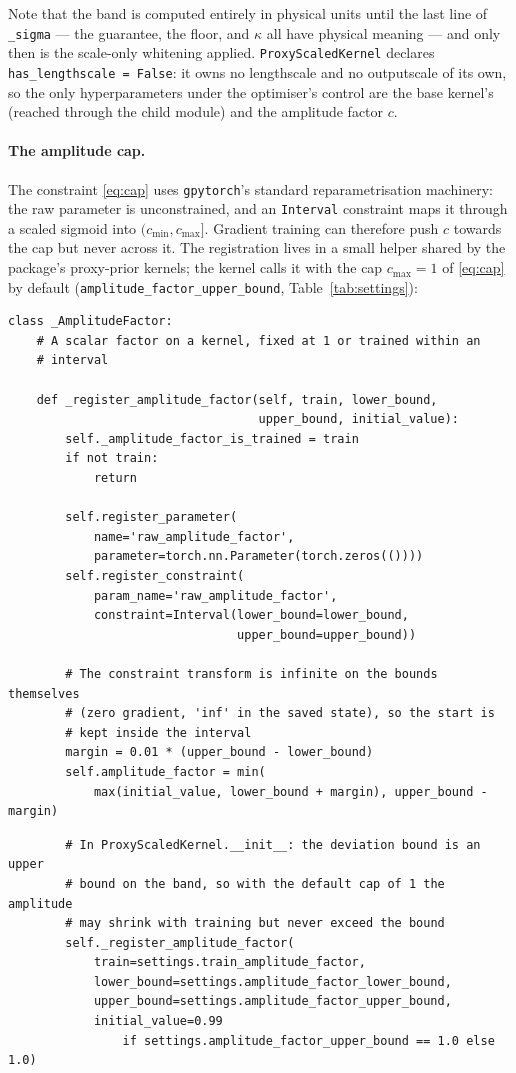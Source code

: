 \documentclass[11pt,a4paper]{article}
\newcommand{\code}[1]{\texttt{#1}}
\begin{document}
Note that the band is computed entirely in physical units until the last
line of \code{\_sigma} --- the guarantee, the floor, and $\kappa$ all have
physical meaning --- and only then is the scale-only whitening applied.
\code{ProxyScaledKernel}
declares \code{has\_lengthscale = False}: it owns no lengthscale and no
outputscale of its own, so the only hyperparameters under the optimiser's
control are the base kernel's (reached through the child module) and the
amplitude factor $c$.

\paragraph{The amplitude cap.} The constraint \eqref{eq:cap} uses
\code{gpytorch}'s standard reparametrisation machinery: the raw parameter is
unconstrained, and an \code{Interval} constraint maps it through a scaled
sigmoid into $(c_{\min}, c_{\max}]$. Gradient training can therefore push $c$
towards the cap but never across it. The registration lives in a small
helper shared by the package's proxy-prior kernels; the kernel calls it with
the cap $c_{\max} = 1$ of \eqref{eq:cap} by default
(\code{amplitude\_factor\_upper\_bound}, Table~\ref{tab:settings}):

\begin{lstlisting}
class _AmplitudeFactor:
    # A scalar factor on a kernel, fixed at 1 or trained within an
    # interval

    def _register_amplitude_factor(self, train, lower_bound,
                                   upper_bound, initial_value):
        self._amplitude_factor_is_trained = train
        if not train:
            return

        self.register_parameter(
            name='raw_amplitude_factor',
            parameter=torch.nn.Parameter(torch.zeros(())))
        self.register_constraint(
            param_name='raw_amplitude_factor',
            constraint=Interval(lower_bound=lower_bound,
                                upper_bound=upper_bound))

        # The constraint transform is infinite on the bounds themselves
        # (zero gradient, 'inf' in the saved state), so the start is
        # kept inside the interval
        margin = 0.01 * (upper_bound - lower_bound)
        self.amplitude_factor = min(
            max(initial_value, lower_bound + margin), upper_bound - margin)
\end{lstlisting}

\begin{lstlisting}
        # In ProxyScaledKernel.__init__: the deviation bound is an upper
        # bound on the band, so with the default cap of 1 the amplitude
        # may shrink with training but never exceed the bound
        self._register_amplitude_factor(
            train=settings.train_amplitude_factor,
            lower_bound=settings.amplitude_factor_lower_bound,
            upper_bound=settings.amplitude_factor_upper_bound,
            initial_value=0.99
                if settings.amplitude_factor_upper_bound == 1.0 else 1.0)
\end{lstlisting}
\end{document}

